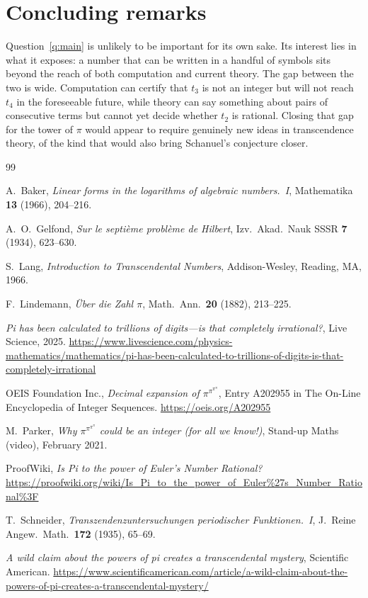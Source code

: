 \documentclass[11pt]{amsart}
\theoremstyle{definition}
\theoremstyle{remark}
\begin{document}
\section{Concluding remarks}

Question~\ref{q:main} is unlikely to be important for its own sake. Its interest lies in what it exposes: a number that can be written in a handful of symbols sits beyond the reach of both computation and current theory. The gap between the two is wide. Computation can certify that $t_3$ is not an integer but will not reach $t_4$ in the foreseeable future, while theory can say something about pairs of consecutive terms but cannot yet decide whether $t_2$ is rational. Closing that gap for the tower of $\pi$ would appear to require genuinely new ideas in transcendence theory, of the kind that would also bring Schanuel's conjecture closer.

\begin{thebibliography}{99}

A.~Baker, \emph{Linear forms in the logarithms of algebraic numbers.~I}, Mathematika \textbf{13} (1966), 204--216.

A.~O.~Gelfond, \emph{Sur le septi\`eme probl\`eme de Hilbert}, Izv.\ Akad.\ Nauk SSSR \textbf{7} (1934), 623--630.

S.~Lang, \emph{Introduction to Transcendental Numbers}, Addison-Wesley, Reading, MA, 1966.

F.~Lindemann, \emph{\"Uber die Zahl $\pi$}, Math.\ Ann.\ \textbf{20} (1882), 213--225.

\emph{Pi has been calculated to trillions of digits---is that completely irrational?}, Live Science, 2025. \url{https://www.livescience.com/physics-mathematics/mathematics/pi-has-been-calculated-to-trillions-of-digits-is-that-completely-irrational}

OEIS Foundation Inc., \emph{Decimal expansion of $\pi^{\pi^{\pi^{\pi}}}$}, Entry A202955 in The On-Line Encyclopedia of Integer Sequences. \url{https://oeis.org/A202955}

M.~Parker, \emph{Why $\pi^{\pi^{\pi^{\pi}}}$ could be an integer (for all we know!)}, Stand-up Maths (video), February 2021.

ProofWiki, \emph{Is Pi to the power of Euler's Number Rational?} \url{https://proofwiki.org/wiki/Is_Pi_to_the_power_of_Euler\%27s_Number_Rational\%3F}

T.~Schneider, \emph{Transzendenzuntersuchungen periodischer Funktionen.~I}, J.\ Reine Angew.\ Math.\ \textbf{172} (1935), 65--69.

\emph{A wild claim about the powers of pi creates a transcendental mystery}, Scientific American. \url{https://www.scientificamerican.com/article/a-wild-claim-about-the-powers-of-pi-creates-a-transcendental-mystery/}

\end{thebibliography}
\end{document}
